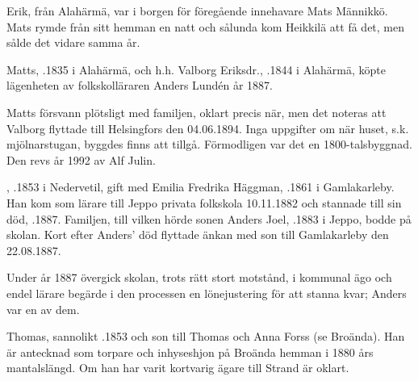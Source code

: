%
Erik, från Alahärmä, var i borgen för föregående innehavare Mats Männikkö. Mats rymde från sitt hemman en natt och sålunda kom Heikkilä att få det, men sålde det vidare samma år.\jhvspace{}


%
Matts, .1835 i Alahärmä, och h.h. Valborg Eriksdr., .1844 i Alahärmä, köpte lägenheten av folkskolläraren Anders Lundén år 1887.
\begin{jhchildren}
  \item {}
  \item {}
  \item {}
  \item {}
  \item {}
\end{jhchildren}
Matts försvann plötsligt med familjen, oklart precis när, men det noteras att Valborg flyttade till Helsingfors den 04.06.1894. Inga uppgifter om när huset, s.k. mjölnarstugan, byggdes finns att tillgå. Förmodligen var det en 1800-talsbyggnad. Den revs år 1992 av Alf Julin.


%
, .1853 i Nedervetil, gift med Emilia Fredrika Häggman, .1861 i Gamlakarleby. Han kom som lärare till Jeppo privata folkskola 10.11.1882 och stannade till sin död, .1887. Familjen, till vilken hörde sonen Anders Joel, .1883 i Jeppo, bodde på skolan. Kort efter Anders' död flyttade änkan med son till Gamlakarleby den 22.08.1887.

Under år 1887 övergick skolan, trots rätt stort motstånd, i kommunal ägo och endel lärare begärde i den processen en lönejustering för att stanna kvar; Anders var en av dem.


%
Thomas, sannolikt .1853 och son till Thomas och Anna Forss (se Broända). Han är antecknad som torpare och inhyseshjon på Broända hemman i 1880 års mantalslängd. Om han har varit kortvarig ägare till Strand är oklart.\jhvspace{}


